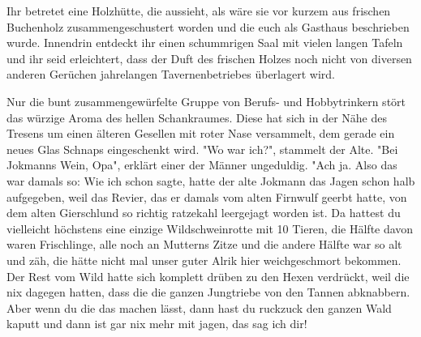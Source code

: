\label{aiw_quelle2}
Ihr betretet eine Holzhütte, die aussieht, als wäre sie vor kurzem aus frischen Buchenholz zusammengeschustert worden und die euch als Gasthaus beschrieben wurde. Innendrin entdeckt ihr einen schummrigen Saal mit vielen langen Tafeln und ihr seid erleichtert, dass der Duft des frischen Holzes noch nicht von diversen anderen Gerüchen jahrelangen Tavernenbetriebes überlagert wird.

Nur die bunt zusammengewürfelte Gruppe von Berufs- und Hobbytrinkern stört das würzige Aroma des hellen Schankraumes. Diese hat sich in der Nähe des Tresens um einen älteren Gesellen mit roter Nase versammelt, dem gerade ein neues Glas Schnaps eingeschenkt wird. "Wo war ich?", stammelt der Alte. "Bei Jokmanns Wein, Opa", erklärt einer der Männer ungeduldig. "Ach ja. Also das war damals so: Wie ich schon sagte, hatte der alte Jokmann das Jagen schon halb aufgegeben, weil das Revier, das er damals vom alten Firnwulf geerbt hatte, von dem alten Gierschlund so richtig ratzekahl leergejagt worden ist. Da hattest du vielleicht höchstens eine einzige Wildschweinrotte mit 10 Tieren, die Hälfte davon waren Frischlinge, alle noch an Mutterns Zitze und die andere Hälfte war so alt und zäh, die hätte nicht mal unser guter Alrik hier weichgeschmort bekommen.
Der Rest vom Wild hatte sich komplett drüben zu den Hexen verdrückt, weil die nix dagegen hatten, dass die die ganzen Jungtriebe von den Tannen abknabbern. Aber wenn du die das machen lässt, dann hast du ruckzuck den ganzen Wald kaputt und dann ist gar nix mehr mit jagen, das sag ich dir!


